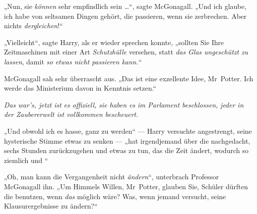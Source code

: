 „Nun, sie \emph{können} sehr empfindlich sein …“, sagte McGonagall.
„Und ich glaube, ich habe von seltsamen Dingen gehört, die passieren, wenn sie zerbrechen. Aber nichts \emph{dergleichen}!“

„Vielleicht“, sagte Harry, als er wieder sprechen konnte, „sollten Sie Ihre Zeitmaschinen mit einer Art \emph{Schutzhülle} versehen, statt \emph{das Glas ungeschützt zu lassen}, damit \emph{so etwas nicht passieren kann.}“

McGonagall sah sehr überrascht aus.
„Das ist eine exzellente Idee, Mr~Potter. Ich werde das Ministerium davon in Kenntnis setzen.“

\emph{Das war’s, jetzt ist es offiziell, sie haben es im Parlament beschlossen, jeder in der Zaubererwelt ist vollkommen bescheuert.}

„Und obwohl ich es hasse, ganz  zu werden“ — Harry versuchte angestrengt, seine hysterische Stimme etwas zu senken — „hat irgendjemand über die  nachgedacht, sechs Stunden zurückzugehen und etwas zu tun, das die Zeit ändert, wodurch so ziemlich  und “

„Oh, man kann die Vergangenheit nicht \emph{ändern}“, unterbrach Professor McGonagall ihn.
„Um Himmels Willen, Mr~Potter, glauben Sie, Schüler dürften die benutzen, wenn \emph{das} möglich wäre? Was, wenn jemand versucht, seine Klausurergebnisse zu ändern?“

